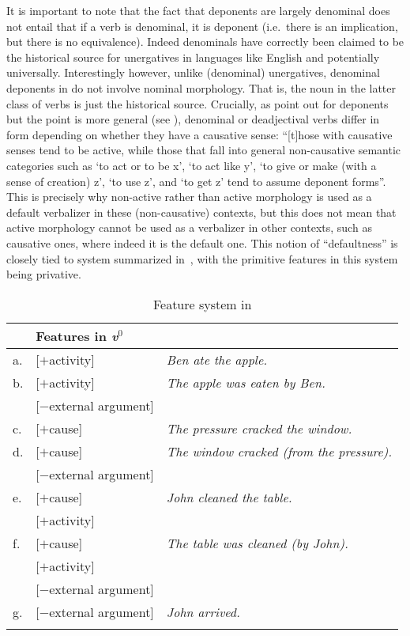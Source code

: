 \documentclass[output=paper]{langsci/langscibook}
\begin{document}
It is important to note that the fact that deponents are largely denominal does
not entail that if a verb is denominal, it is deponent (i.e.\ there is an
implication, but there is no equivalence). Indeed denominals have correctly
been claimed to be the historical source for unergatives in languages like
English and potentially universally. Interestingly however, unlike (denominal)
unergatives, denominal deponents in  do not involve nominal morphology.
That is, the noun in the latter class of verbs is just the historical source.
Crucially, as \textcite[139]{Xuetal2007} point out for  deponents but the
point is more general (see \citealt{Kallulli2013}),  denominal or
deadjectival verbs differ in form depending on whether they have a causative
sense: “[t]hose with causative senses tend to be active, while those that fall
into general non-causative semantic categories such as ‘to act or to be x’, ‘to
act like y’, ‘to give or make (with a sense of creation) z’, ‘to use z’, and
‘to get z’ tend to assume deponent forms”. This is precisely why non-active
rather than active morphology is used as a default verbalizer in these
(non-causative) contexts, but this does not mean that active morphology cannot
be used as a verbalizer in other contexts, such as causative ones, where indeed
it is the default one. This notion of \enquote{defaultness} is closely
tied to  system summarized in~, with
the primitive features in this system being privative.

\begin{table}[htpb]
    \centering
    \begin{tabular}{lll}
    \lsptoprule
    & Features in \emph{v}$^0$  & \\
    \midrule
    a.  & [$+$activity]             & \emph{Ben ate the apple.}\\
    b.  & [$+$activity]             & \emph{The apple was eaten by Ben.}\\
        & [$-$external argument]    & \\
    c.  & [$+$cause]                & \emph{The pressure cracked the window.}\\
    d.  & [$+$cause]                & \emph{The window cracked (from the pressure).} \\
        & [$-$external argument]    & \\
    e.  & [$+$cause]                & \emph{John cleaned the table.}\\
        & [$+$activity]             & \\
    f.  & [$+$cause]                & \emph{The table was cleaned (by John).}\\
        & [$+$activity]             & \\
        & [$-$external argument]    & \\
    g.  & [$-$external argument]    & \emph{John arrived.}\\
    \lspbottomrule
    \end{tabular}
    \caption{Feature system in \textcite{Kallulli2007}}\label{tb:10.1}
\end{table}
\end{document}
